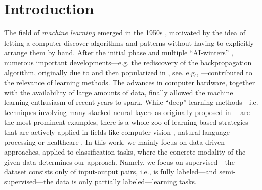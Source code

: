 \chapter{Introduction}
%
%
The field of \textit{machine learning} emerged in the 1950s \cite{samuel1959some, rosenblatt1958perceptron}, motivated by the idea of letting a computer discover algorithms and patterns without having to explicitly arrange them by hand. After the initial phase and multiple \enquote{AI-winters} \cite{steele1996evolution}, numerous important developments---e.g. the rediscovery of the backpropagation algorithm, originally due to \cite{kelley1960gradient,rosenblatt1962principles} and then popularized in \cite{rumelhart1986learning}, see, e.g., \cite{schmidhuber2022annotated}---contributed to the relevance of learning methods. The advances in computer hardware, together with the availability of large amounts of data, finally allowed the machine learning enthusiasm of recent years to spark. While \enquote{deep} learning methods---i.e. techniques involving many stacked neural layers as originally proposed in \cite{rosenblatt1958perceptron}---are the most prominent examples, there is a whole zoo of learning-based strategies that are actively applied in fields like computer vision \cite{chai2021deep}, natural language processing \cite{khurana2023natural} or healthcare \cite{shehab2022machine}. In this work, we mainly focus on data-driven approaches, applied to classification tasks, where the concrete modality of the given data determines our approach. Namely, we focus on supervised---the dataset consists only of input-output pairs, i.e., is fully labeled---and semi-supervised---the data is only partially labeled---learning tasks.


